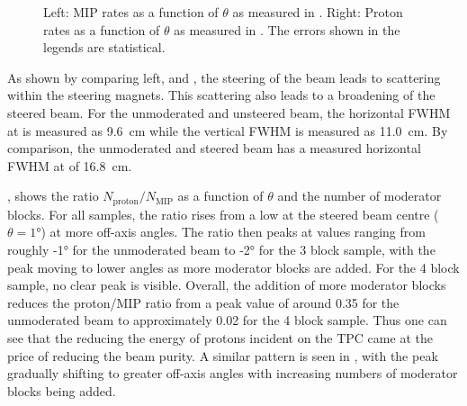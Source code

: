 \begin{figure}[h]
  \begin{minipage}[t]{.5\textwidth}
    \begin{adjustbox}{max totalsize=\textwidth, center}
      
    \end{adjustbox}
  \end{minipage}
  \hfill
  \begin{minipage}[t]{.5\textwidth}
    \begin{adjustbox}{max totalsize=\textwidth, center}
      
    \end{adjustbox}      
  \end{minipage}
  \caption[Proton and MIP distributions as a function of $\theta$]{Left: MIP rates as a function of $\theta$ as measured in \SThree. Right: Proton rates as a function of $\theta$ as measured in \SThree. The errors shown in the legends are statistical.}
  \label{fig:protonMipS3}
\end{figure}

As shown by comparing  left, and , the steering of the beam leads to scattering within the steering magnets.
This scattering also leads to a broadening of the steered beam.
For the unmoderated and unsteered beam, the horizontal FWHM at \SThree is measured as \SI{9.6}{\centi\metre} while the vertical FWHM is measured as \SI{11.0}{\centi\metre}.
By comparison, the unmoderated and steered beam has a measured horizontal FWHM at \SThree of \SI{16.8}{\centi\metre}.

, shows the ratio $N_{\text{proton}}/N_{\text{MIP}}$ as a function of $\theta$ and the number of moderator blocks.
For all samples, the ratio rises from a low at the steered beam centre ($\theta = \ang{1}$) at more off-axis angles.
The ratio then peaks at values ranging from roughly \ang{-1} for the unmoderated beam to \ang{-2} for the 3 block sample, with the peak moving to lower angles as more moderator blocks are added.
For the 4 block sample, no clear peak is visible.
Overall, the addition of more moderator blocks reduces the proton/MIP ratio from a peak value of around 0.35 for the unmoderated beam to approximately 0.02 for the 4 block sample.
Thus one can see that the reducing the energy of protons incident on the TPC came at the price of reducing the beam purity.
A similar pattern is seen in , with the peak gradually shifting to greater off-axis angles with increasing numbers of moderator blocks being added.

